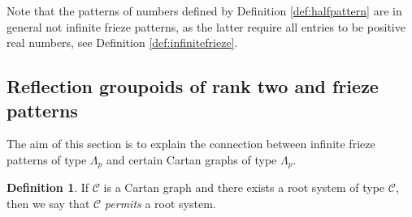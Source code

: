 \documentclass[11pt,a4paper]{amsart}
\theoremstyle{definition}
\newtheorem{Definition}[Lemma]{Definition}
\numberwithin{equation}{section}
\newcommand{\Cc }{\mathcal{C}}
\begin{document}
Note that the patterns of numbers defined
by Definition \ref{def:halfpattern} are in
general not infinite frieze patterns, as 
the latter require all entries to be 
positive real numbers, see Definition 
\ref{def:infinitefrieze}.



\subsection{Reflection groupoids of rank two and frieze patterns}

The aim of this section is to explain the 
connection between infinite frieze patterns 
of type $\Lambda_p$ and certain Cartan graphs 
of type $\Lambda_p$. 

\begin{Definition}
If $\Cc $ is a Cartan graph and there exists a root system of type $\Cc $, then we say that $\Cc$ \emph{permits} a root system.
\end{Definition}
\end{document}
